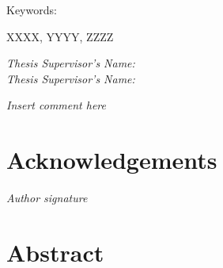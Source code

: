 \documentclass[openany]{article}
\begin{document}
\begin{titlepage}
{\flushleft \normalsize Keywords:\par}\vspace{0cm}

{XXXX, YYYY, ZZZZ \par}
\vspace{1.5cm}

{\flushleft \normalsize \textit{Thesis Supervisor’s Name: }\\}\vspace{0cm}
{\flushleft \normalsize \textit{Thesis Supervisor’s Name: }\\}\vspace{0cm}

\end{titlepage}

\clearpage\thispagestyle{empty}\null\newpage %
	
\newpage
\thispagestyle{plain}

\mbox{}\par 
\vspace{4.5cm}

\begin{flushright}
    \textit{Insert comment here}
\end{flushright}

\clearpage\thispagestyle{empty}\null\newpage %
	
\newpage
\thispagestyle{plain}
\section*{Acknowledgements}
    
    \lipsum[1]
    
    \mbox{}\par 
    \vspace{0.5cm}
    
    \begin{flushright}
        \textit{Author signature}
    \end{flushright}


\clearpage\thispagestyle{empty}\null\newpage %

\newpage
\thispagestyle{plain}

\section*{Abstract}

    \lipsum[1]\\
    
    \vspace{2cm}
    
\end{document}
